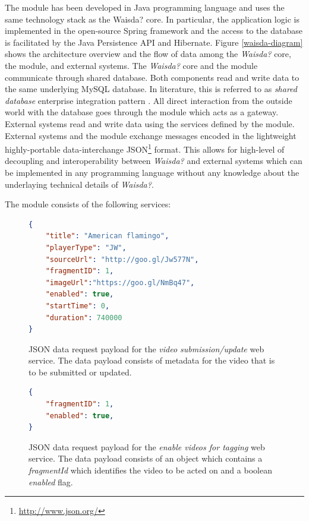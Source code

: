 The module has been developed in Java programming language and uses the same technology stack as the Waisda? core. In particular, the application logic is implemented in the open-source Spring framework and the access to the database is facilitated by the Java Persistence API and Hibernate. Figure \ref{waisda-diagram} shows the architecture overview and the flow of data among the \textit{Waisda?} core, the module, and external systems. The \textit{Waisda?} core and the module communicate through shared database. Both components read and write data to the same underlying MySQL database. In literature, this is referred to as \textit{shared database} enterprise integration pattern \cite{Hohpe:2003:EIP:940308}. All direct interaction from the outside world with the database goes through the module which acts as a gateway. External systems read and write data using the services defined by the module. External systems and the module exchange messages encoded in the lightweight highly-portable data-interchange JSON\footnote{\url{http://www.json.org/}} format. This allows for high-level of decoupling and interoperability between \textit{Waisda?} and external systems which can be implemented in any programming language without any knowledge about the underlaying technical details of \textit{Waisda?}.

The module consists of the following services:

\begin{figure}
\centering
\begin{lstlisting}[language=json,firstnumber=1]
{
	"title": "American flamingo",
	"playerType": "JW",
	"sourceUrl": "http://goo.gl/Jw577N",
	"fragmentID": 1,
	"imageUrl":"https://goo.gl/NmBq47",
	"enabled": true,
	"startTime": 0,
	"duration": 740000
}
\end{lstlisting}
\caption{JSON data request payload for the \textit{video submission/update} web service. The data payload consists of metadata for the video that is to be submitted or updated.}
\label{chap:waisda:add-update-json}
\end{figure}


\begin{figure}
\centering
\begin{lstlisting}[language=json,firstnumber=1]
{
	"fragmentID": 1,
	"enabled": true,
}
\end{lstlisting}
\caption{JSON data request payload for the \textit{enable videos for tagging} web service. The data payload consists of an object which contains a \textit{fragmentId} which identifies the video to be acted on and a boolean \textit{enabled} flag.}
\label{chap:waisda:enable-json}
\end{figure}

